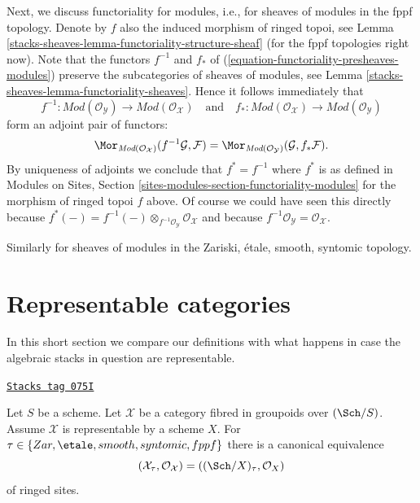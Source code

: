 \medskip\noindent
Next, we discuss functoriality for modules, i.e., for sheaves of modules
in the fppf topology. Denote by $f$ also the induced morphism of ringed
topoi, see
Lemma \ref{stacks-sheaves-lemma-functoriality-structure-sheaf}
(for the fppf topologies right now). Note that the functors
$f^{-1}$ and $f_*$ of (\ref{equation-functoriality-presheaves-modules})
preserve the subcategories of sheaves of modules, see
Lemma \ref{stacks-sheaves-lemma-functoriality-sheaves}.
Hence it follows immediately that
\begin{equation}
\label{equation-functoriality-sheaves-modules}
f^{-1} :
\textit{Mod}(\mathcal{O}_\mathcal{Y})
\longrightarrow
\textit{Mod}(\mathcal{O}_\mathcal{X})
\quad\text{and}\quad
f_* :
\textit{Mod}(\mathcal{O}_\mathcal{X})
\longrightarrow
\textit{Mod}(\mathcal{O}_\mathcal{Y})
\end{equation}
form an adjoint pair of functors:
$$
\Mor_{\textit{Mod}(\mathcal{O}_\mathcal{X})}(
f^{-1}\mathcal{G}, \mathcal{F})
=
\Mor_{\textit{Mod}(\mathcal{O}_\mathcal{Y})}(
\mathcal{G}, f_*\mathcal{F}).
$$
By uniqueness of adjoints we conclude that
$f^* = f^{-1}$ where $f^*$ is as defined in
Modules on Sites, Section \ref{sites-modules-section-functoriality-modules}
for the morphism of ringed topoi $f$ above. Of course we could have
seen this directly because
$f^*(-) = f^{-1}(-) \otimes_{f^{-1}\mathcal{O}_\mathcal{Y}}
\mathcal{O}_\mathcal{X}$ and because
$f^{-1}\mathcal{O}_\mathcal{Y} = \mathcal{O}_\mathcal{X}$.

\medskip\noindent
Similarly for sheaves of modules in the Zariski, \'etale, smooth, syntomic
topology.

\section{Representable categories}
\label{stacks-sheaves-section-representable}
In this short section we compare our definitions with what happens
in case the algebraic stacks in question are representable.

\begin{lemma}
\label{stacks-sheaves-lemma-compare-with-scheme}
\href{https://stacks.math.columbia.edu/tag/075I}{\texttt{Stacks tag 075I}}

Let $S$ be a scheme. Let $\mathcal{X}$ be a category fibred
in groupoids over $(\Sch/S)$. Assume $\mathcal{X}$ is representable
by a scheme $X$. For $\tau \in \{Zar,\linebreak[0] \etale,\linebreak[0]
smooth,\linebreak[0] syntomic,\linebreak[0] fppf\}$
there is a canonical equivalence
$$
(\mathcal{X}_\tau, \mathcal{O}_\mathcal{X}) =
((\Sch/X)_\tau, \mathcal{O}_X)
$$
of ringed sites.
\end{lemma}

